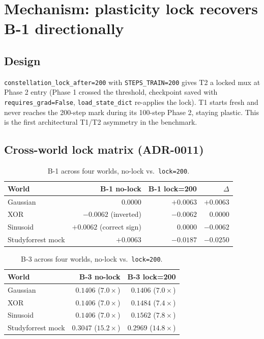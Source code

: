 \documentclass{article}
\begin{document}

\section{Mechanism: plasticity lock recovers B-1 directionally}
\label{sec:mechanism}

\subsection{Design}

\texttt{constellation\_lock\_after=200} with
\texttt{STEPS\_TRAIN=200} gives T2 a locked mux at Phase 2 entry
(Phase 1 crossed the threshold, checkpoint saved with
\texttt{requires\_grad=False},
\texttt{load\_state\_dict} re-applies the lock). T1 starts fresh
and never reaches the 200-step mark during its 100-step Phase 2,
staying plastic. This is the first architectural T1/T2 asymmetry
in the benchmark.

\subsection{Cross-world lock matrix (ADR-0011)}
\label{sec:lock-matrix}

\begin{table}[ht]
  \centering
  \caption{B-1 across four worlds, no-lock vs.\ \texttt{lock=200}.}
  \label{tab:lock-b1}
  \begin{tabular}{lrrr}
    \toprule
    World & B-1 no-lock & B-1 lock=200 & $\Delta$ \\
    \midrule
    Gaussian & $0.0000$ & $+0.0063$ & $+0.0063$ \\
    XOR      & $-0.0062$ (inverted) & $-0.0062$ & $0.0000$ \\
    Sinusoid & $+0.0062$ (correct sign) & $0.0000$ & $-0.0062$ \\
    Studyforrest mock & $+0.0063$ & $-0.0187$ & $-0.0250$ \\
    \bottomrule
  \end{tabular}
\end{table}

\begin{table}[ht]
  \centering
  \caption{B-3 across four worlds, no-lock vs.\ \texttt{lock=200}.}
  \label{tab:lock-b3}
  \begin{tabular}{lrr}
    \toprule
    World & B-3 no-lock & B-3 lock=200 \\
    \midrule
    Gaussian & $0.1406$ ($7.0\times$) & $0.1406$ ($7.0\times$) \\
    XOR      & $0.1406$ ($7.0\times$) & $0.1484$ ($7.4\times$) \\
    Sinusoid & $0.1406$ ($7.0\times$) & $0.1562$ ($7.8\times$) \\
    Studyforrest mock & $0.3047$ ($15.2\times$) & $0.2969$ ($14.8\times$) \\
    \bottomrule
  \end{tabular}
\end{table}
\end{document}
